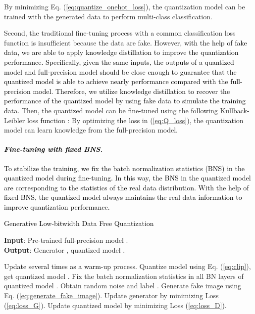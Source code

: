 \documentclass[runningheads]{llncs}
\def\mytitle{\textcolor{black}{Generative Low-bitwidth Data Free Quantization }}
\def\xsk{\textcolor{black}}
\def\jie{\textcolor{black}}
\def\wrong{\textcolor{black}}
\def\new{\textcolor{black}}
\begin{document}
By minimizing Eq. (\ref{eq:quantize_onehot_loss}), the quantization model can be trained with the generated data to perform multi-class classification.

Second, the traditional fine-tuning process with a common classification loss function is insufficient because the data are fake.
\jie{\new{However,} with the help of fake data, we are able to apply knowledge distillation \cite{hinton2015distilling} to improve the quantization performance.
Specifically, 
given the same inputs, the outputs of a quantized model and full-precision model should be close enough to guarantee that the quantized model is able to achieve nearly performance compared with the full-precision model.
Therefore, we utilize knowledge distillation to recover the performance of the quantized model by using fake data  to simulate the training data.
}
Then, the quantized model can be fine-tuned using the following Kullback-Leibler loss \new{function} :
\xsk{}By optimizing \new{the loss in} (\ref{eq:Q_loss}), the quantization model can learn knowledge from the full-precision model.

\paragraph{\emph{\textbf{\xsk{Fine-tuning with fixed BNS.}}}}

\jie{
To stabilize the training, we fix the batch normalization statistics (BNS) in the quantized model during fine-tuning. In this way, the BNS in the quantized model \new{are} corresponding to the statistics of the real data distribution.
With the help of fixed BNS, the quantized model always maintains the real data information to improve quantization performance. 
}





\begin{algorithm}[t]
\caption{\mytitle}
\label{alg:alg1}
\textbf{Input}: Pre-trained full-precision model .\\
\textbf{Output}: Generator , quantized model .

 \begin{algorithmic}[l]
    \STATE \wrong{Update  several times as a warm-up process.}
    \STATE Quantize model  using Eq. (\ref{eq:clip}), get quantized model .
    \STATE Fix the batch normalization statistics in all BN layers of quantized model .
    \FOR {}
    \STATE Obtain random noise  and label .
	\STATE Generate fake image  using Eq. (\ref{eq:generate_fake_image}).
	\STATE Update generator  by minimizing Loss (\ref{eq:loss_G}).
	\STATE Update quantized model  by minimizing Loss (\ref{eq:loss_D}).
    \ENDFOR
	\end{algorithmic}
	\label{alg:AT}
\end{algorithm}
\end{document}
